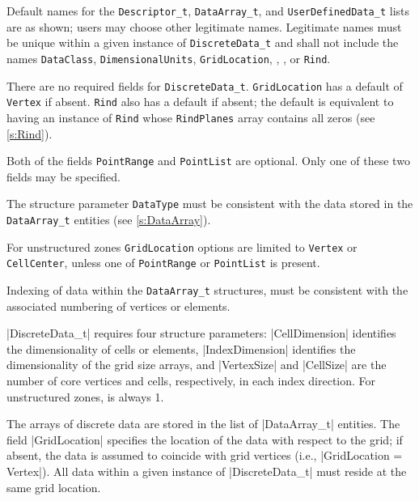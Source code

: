 \begin{notes}
\item Default names for the \texttt{Descriptor\_t},
      \texttt{DataArray\_t}, and \texttt{UserDefinedData\_t} lists are
      as shown; users may choose other legitimate names.
      Legitimate names must be unique within a given instance
      of \texttt{DiscreteData\_t} and shall not include the
      names \texttt{DataClass}, \texttt{DimensionalUnits},
      \texttt{GridLocation}, , , or \texttt{Rind}.
\item There are no required fields for \texttt{DiscreteData\_t}.
      \texttt{GridLocation} has a default of \texttt{Vertex} if absent.
      \texttt{Rind} also has a default if absent; the default
      is equivalent to having an instance of \texttt{Rind}
      whose \texttt{RindPlanes} array contains all zeros (see
      \autoref{s:Rind}).
\item Both of the fields \texttt{PointRange} and
      \texttt{PointList} are optional.  Only one of these
      two fields may be specified.
\item The structure parameter \texttt{DataType} must be consistent
      with the data stored in the \texttt{DataArray\_t} entities (see
      \autoref{s:DataArray}).
\item For unstructured zones \texttt{GridLocation} options are limited
      to \texttt{Vertex} or \texttt{CellCenter}, unless
      one of \texttt{PointRange} or \texttt{PointList} is present.
\item Indexing of data within the \texttt{DataArray\_t} structures, must be
      consistent with the associated numbering of vertices or elements.
\end{notes}

|DiscreteData_t| requires four structure parameters:
|CellDimension| identifies the dimensionality of cells or
elements, |IndexDimension| identifies the dimensionality of the grid
size arrays, and |VertexSize| and |CellSize| are the number of core vertices and
cells, respectively, in each index direction. For unstructured
zones,  is always 1.

The arrays of discrete data are stored in the list of |DataArray_t|
entities.
The field |GridLocation| specifies the location of the data with respect
to the grid; if absent, the data is assumed to coincide with grid
vertices (i.e., |GridLocation = Vertex|).
All data within a given instance of |DiscreteData_t| must reside at the
same grid location.

